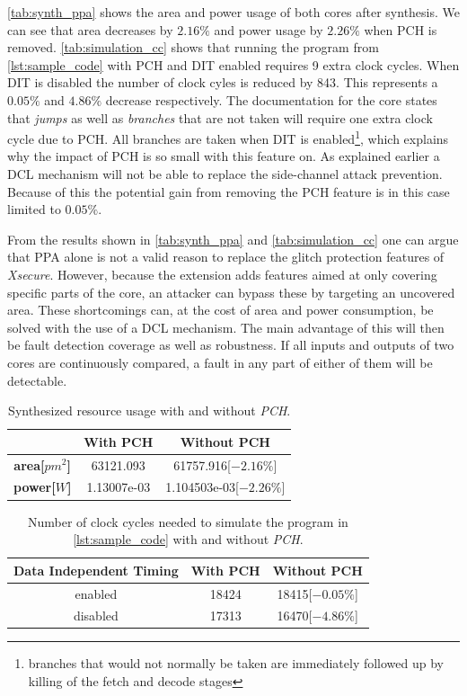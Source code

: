 \autoref{tab:synth_ppa} shows the area and power usage of both cores after synthesis. We can see that area decreases by $2.16\%$ and power usage by $2.26\%$ when PCH is removed. \autoref{tab:simulation_cc} shows that running the program from \autoref{lst:sample_code} with PCH and DIT enabled requires 9 extra clock cycles. When DIT is disabled the number of clock cyles is reduced by 843. This represents a $0.05\%$ and $4.86\%$ decrease respectively. The documentation for the core states that \textit{jumps} as well as \textit{branches} that are not taken will require one extra clock cycle due to PCH. All branches are taken when DIT is enabled\footnote{branches that would not normally be taken are immediately followed up by killing of the fetch and decode stages}, which explains why the impact of PCH is so small with this feature on\cite{cv32e40s_manual}. As explained earlier a DCL mechanism will not be able to replace the side-channel attack prevention. Because of this the potential gain from removing the PCH feature is in this case limited to $0.05\%$. 

From the results shown in \autoref{tab:synth_ppa} and \autoref{tab:simulation_cc} one can argue that PPA alone is not a valid reason to replace the glitch protection features of \textit{Xsecure}. However, because the extension adds features aimed at only covering specific parts of the core, an attacker can bypass these by targeting an uncovered area. These shortcomings can, at the cost of area and power consumption, be solved with the use of a DCL mechanism. The main advantage of this will then be fault detection coverage as well as robustness. If all inputs and outputs of two cores are continuously compared, a fault in any part of either of them will be detectable.  

\begin{table}[h]
\centering
\caption{Synthesized resource usage with and without \textit{PCH}.}
\label{tab:synth_ppa}
\begin{tabular}{ccc}
\toprule 
& With PCH & Without PCH \\
\midrule
\rowcolor{black!20} \textbf{area[$pm^2$]} & 63121.093 & 61757.916[$-2.16\%$] \\
\textbf{power[$W$]} & 1.13007e-03 & 1.104503e-03[$-2.26\%$] \\
\bottomrule
\end{tabular}
\end{table}

\begin{table}[h]
\centering
\caption{Number of clock cycles needed to simulate the program in \autoref{lst:sample_code} with and without \textit{PCH}.}
\label{tab:simulation_cc}
\begin{tabular}{c|cc}
\toprule 
Data Independent Timing & With PCH & Without PCH \\
\midrule
\rowcolor{black!20} enabled & 18424 & 18415[$-0.05\%$] \\
disabled & 17313 & 16470[$-4.86\%$] \\
\bottomrule
\end{tabular}
\end{table}

